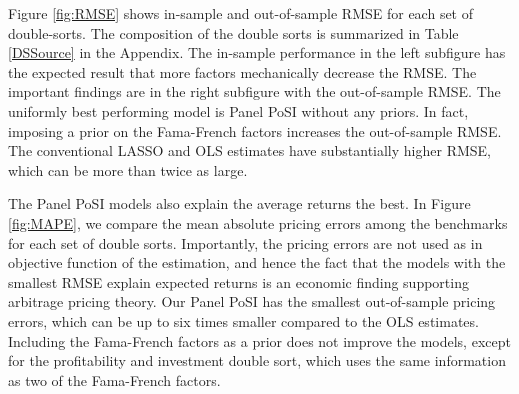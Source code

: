 \documentclass[11pt]{article}
\begin{document}
Figure \ref{fig:RMSE} shows in-sample and out-of-sample RMSE for each set of double-sorts. The composition of the double sorts is summarized in Table \ref{DSSource} in the Appendix. The in-sample performance in the left subfigure has the expected result that more factors mechanically decrease the RMSE. The important findings are in the right subfigure with the out-of-sample RMSE. The uniformly best performing model is Panel PoSI without any priors. In fact, imposing a prior on the Fama-French factors increases the out-of-sample RMSE. The conventional LASSO and OLS estimates have substantially higher RMSE, which can be more than twice as large.

The Panel PoSI models also explain the average returns the best. In Figure \ref{fig:MAPE}, we compare the mean absolute pricing errors among the benchmarks for each set of double sorts. Importantly, the pricing errors are not used as in objective function of the estimation, and hence the fact that the models with the smallest RMSE explain expected returns is an economic finding supporting arbitrage pricing theory. Our Panel PoSI has the smallest out-of-sample pricing errors, which can be up to six times smaller compared to the OLS estimates. Including the Fama-French factors as a prior does not improve the models, except for the profitability and investment double sort, which uses the same information as two of the Fama-French factors. 
\end{document}
